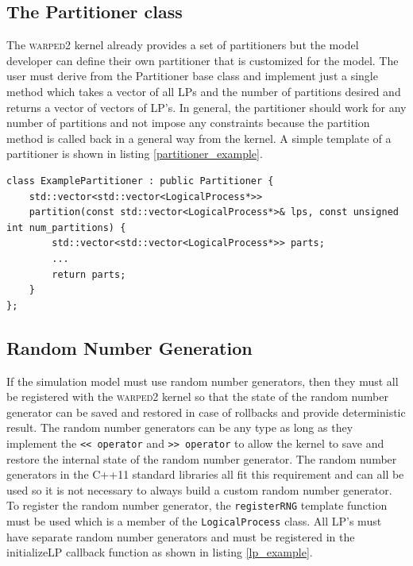 \documentclass[11pt]{book}
\begin{document}
\subsection{The Partitioner class}\label{partitioner}

The \textsc{warped2} kernel already provides a set of partitioners but the model developer can define
their own partitioner that is customized for the model. The user must derive from the Partitioner
base class and implement just a single method which takes a vector of all LPs and the number of
partitions desired and returns a vector of vectors of LP's. In general, the partitioner should
work for any number of partitions and not impose any constraints because the partition method
is called back in a general way from the kernel. A simple template of a partitioner is shown in
listing \ref{partitioner_example}.

\begin{lstlisting}[caption=Example \textsc{warped2} Partitioner Definition, label=partitioner_example, float]
class ExamplePartitioner : public Partitioner {
    std::vector<std::vector<LogicalProcess*>>
    partition(const std::vector<LogicalProcess*>& lps, const unsigned int num_partitions) {
        std::vector<std::vector<LogicalProcess*>> parts;
        ...
        return parts;
    }
};
\end{lstlisting}

\subsection{Random Number Generation}

If the simulation model must use random number generators, then they must all be registered
with the \textsc{warped2} kernel so that the state of the random number generator can be saved and
restored in case of rollbacks and provide deterministic result. The random number generators
can be any type as long as they implement the \texttt{<< operator} and \texttt{>> operator} to
allow the kernel to save and restore the internal state of the random number generator. The
random number generators in the C++11 standard libraries\cite{c++11-rng} all fit this requirement
and can all be used so it is not necessary to always build a custom random number generator. To
register the random number generator, the \texttt{registerRNG} template function must be used which is
a member of the \texttt{LogicalProcess} class. All LP's must have separate random number generators and
must be registered in the initializeLP callback function as shown in listing \ref{lp_example}.
\end{document}
